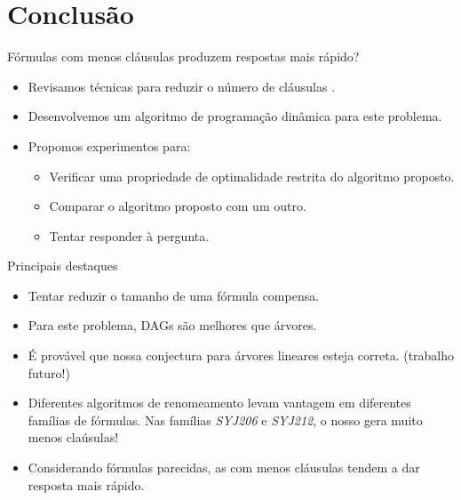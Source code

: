 
\section{Conclusão}

\begin{frame}
	\begin{center}
		Fórmulas com menos cláusulas produzem respostas mais rápido?
	\end{center}
	
	\begin{itemize}
		\pause\item Revisamos técnicas para reduzir o número de cláusulas \cite{de1992optimality,nonnengart2001computing,jackson2004clause}.
		\pause\item Desenvolvemos um algoritmo de programação dinâmica para este problema.
		\pause\item Propomos experimentos para:
		\begin{itemize}
			\pause\item Verificar uma propriedade de optimalidade restrita do algoritmo proposto.
			\pause\item Comparar o algoritmo proposto com um outro.
			\pause\item Tentar responder à pergunta.
		\end{itemize}
	\end{itemize}
\end{frame}

\begin{frame}{Principais destaques}
	\begin{itemize}
		\item Tentar reduzir o tamanho de uma fórmula compensa.
		\pause\item Para este problema, DAGs são melhores que árvores.
		\pause\item É provável que nossa conjectura para árvores lineares esteja correta. \pause (trabalho futuro!)
		\pause\item Diferentes algoritmos de renomeamento levam vantagem em diferentes famílias de fórmulas. \pause Nas famílias \emph{SYJ206} e \emph{SYJ212}, o nosso gera muito menos claúsulas!
		\pause\item Considerando fórmulas parecidas, as com menos cláusulas tendem a dar resposta mais rápido.
	\end{itemize}
\end{frame}

